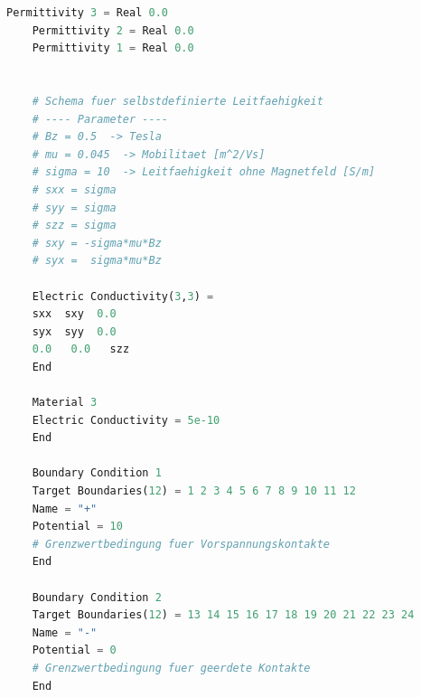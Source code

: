 \documentclass[12pt, a4paper]{article}
\begin{document}
\begin{lstlisting}[language=Python]
	Permittivity 3 = Real 0.0   
	Permittivity 2 = Real 0.0
	Permittivity 1 = Real 0.0
	
	
	# Schema fuer selbstdefinierte Leitfaehigkeit
	# ---- Parameter ----
	# Bz = 0.5  -> Tesla
	# mu = 0.045  -> Mobilitaet [m^2/Vs]
	# sigma = 10  -> Leitfaehigkeit ohne Magnetfeld [S/m]
	# sxx = sigma
	# syy = sigma
	# szz = sigma
	# sxy = -sigma*mu*Bz
	# syx =  sigma*mu*Bz
	
	Electric Conductivity(3,3) = 
	sxx  sxy  0.0
	syx  syy  0.0
	0.0   0.0   szz
	End
	
	Material 3
	Electric Conductivity = 5e-10
	End
	
	Boundary Condition 1
	Target Boundaries(12) = 1 2 3 4 5 6 7 8 9 10 11 12 
	Name = "+"
	Potential = 10
	# Grenzwertbedingung fuer Vorspannungskontakte
	End
	
	Boundary Condition 2
	Target Boundaries(12) = 13 14 15 16 17 18 19 20 21 22 23 24 
	Name = "-"
	Potential = 0
	# Grenzwertbedingung fuer geerdete Kontakte
	End	\end{lstlisting}


\ifdefined\tikzexternalrealjob

\fi
{}	
\end{document}

